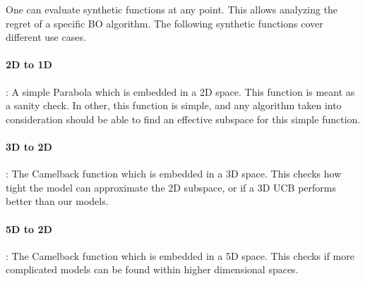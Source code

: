 One can evaluate synthetic functions at any point.
This allows analyzing the regret of a specific BO algorithm.
The following synthetic functions cover different use cases.

\paragraph{2D to 1D}: A simple Parabola which is embedded in a 2D space.
This function is meant as a sanity check.
In other, this function is simple, and any algorithm taken into consideration should be able to find an effective subspace for this simple function.
\paragraph{3D to 2D}: The Camelback function which is embedded in a 3D space.
This checks how tight the model can approximate the 2D subspace, or if a 3D UCB performs better than our models.
\paragraph{5D to 2D}: The Camelback function which is embedded in a 5D space.
This checks if more complicated models can be found within higher dimensional spaces.

